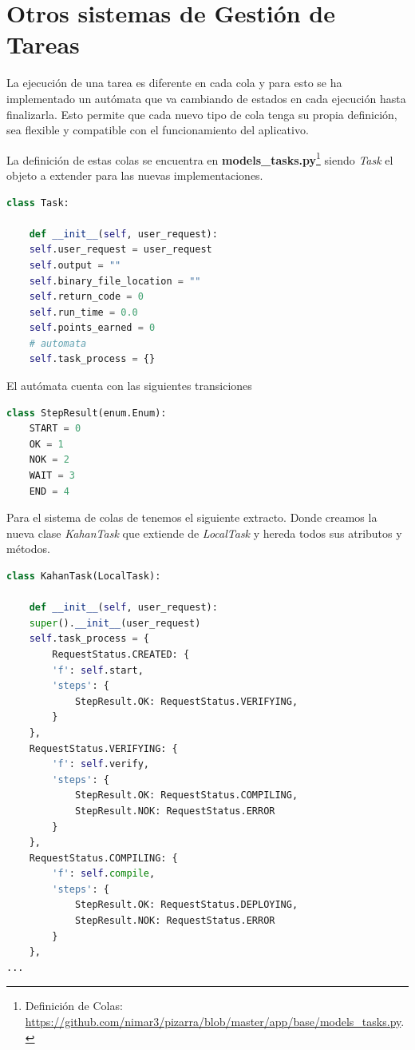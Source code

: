 \documentclass[11pt,spanish,listoffigures,listoftables]{tfgetsinf}
\begin{document}
\section{Otros sistemas de Gestión de Tareas}

La ejecución de una tarea es diferente en cada \Gls{cola} y para esto se ha implementado un autómata que va cambiando de estados en cada ejecución hasta finalizarla. Esto permite que cada nuevo tipo de \Gls{cola} tenga su propia definición, sea flexible y compatible con el funcionamiento del aplicativo.

La definición de estas \Gls{cola}s se encuentra en \textbf{models\_tasks.py}\footnote{Definición de Colas: \url{https://github.com/nimar3/pizarra/blob/master/app/base/models_tasks.py}.} siendo \textit{Task} el objeto a extender para las nuevas implementaciones.

\begin{lstlisting}[language=python]
class Task:

	def __init__(self, user_request):
	self.user_request = user_request
	self.output = ""
	self.binary_file_location = ""
	self.return_code = 0
	self.run_time = 0.0
	self.points_earned = 0
	# automata
	self.task_process = {}
\end{lstlisting}

El autómata cuenta con las siguientes transiciones

\begin{lstlisting}[language=python]
class StepResult(enum.Enum):
	START = 0
	OK = 1
	NOK = 2
	WAIT = 3
	END = 4
\end{lstlisting}

Para el sistema de \Gls{cola}s de \kahan tenemos el siguiente extracto. Donde creamos la nueva clase \textit{KahanTask} que extiende de \textit{LocalTask} y hereda todos sus atributos y métodos.

\begin{lstlisting}[language=python]
class KahanTask(LocalTask):

	def __init__(self, user_request):
	super().__init__(user_request)
	self.task_process = {
		RequestStatus.CREATED: {
		'f': self.start,
		'steps': {
			StepResult.OK: RequestStatus.VERIFYING,
		}
	},
	RequestStatus.VERIFYING: {
		'f': self.verify,
		'steps': {
			StepResult.OK: RequestStatus.COMPILING,
			StepResult.NOK: RequestStatus.ERROR
		}
	},
	RequestStatus.COMPILING: {
		'f': self.compile,
		'steps': {
			StepResult.OK: RequestStatus.DEPLOYING,
			StepResult.NOK: RequestStatus.ERROR
		}
	},
...
\end{lstlisting}
\end{document}

